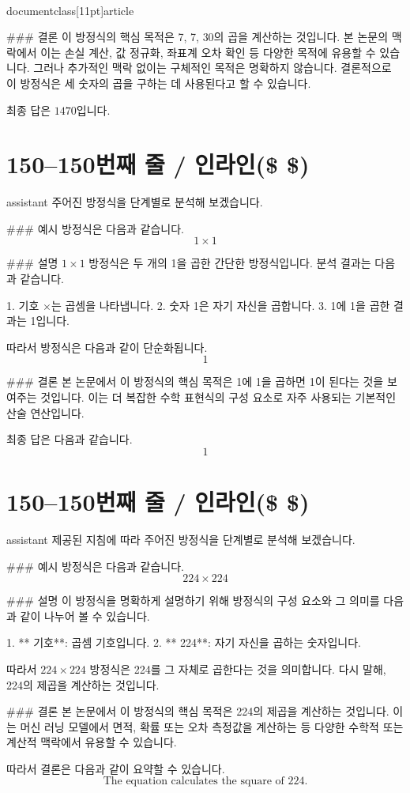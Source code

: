 \\documentclass[11pt]{article}
\begin{document}
### 결론
이 방정식의 핵심 목적은 7, 7, 30의 곱을 계산하는 것입니다. 본 논문의 맥락에서 이는 손실 계산, 값 정규화, 좌표계 오차 확인 등 다양한 목적에 유용할 수 있습니다. 그러나 추가적인 맥락 없이는 구체적인 목적은 명확하지 않습니다. 결론적으로 이 방정식은 세 숫자의 곱을 구하는 데 사용된다고 할 수 있습니다.

최종 답은 \(\boxed{1470}\)입니다.

\section*{150–150번째 줄 / 인라인(\$ \$) }
assistant
주어진 방정식을 단계별로 분석해 보겠습니다.

### 예시
방정식은 다음과 같습니다.
\[ 1 \times 1 \]

### 설명
\( 1 \times 1 \) 방정식은 두 개의 1을 곱한 간단한 방정식입니다. 분석 결과는 다음과 같습니다.

1. 기호 \(\times\)는 곱셈을 나타냅니다.
2. 숫자 1은 자기 자신을 곱합니다.
3. 1에 1을 곱한 결과는 1입니다.

따라서 방정식은 다음과 같이 단순화됩니다.
\[ 1 \]

### 결론
본 논문에서 이 방정식의 핵심 목적은 1에 1을 곱하면 1이 된다는 것을 보여주는 것입니다. 이는 더 복잡한 수학 표현식의 구성 요소로 자주 사용되는 기본적인 산술 연산입니다.

최종 답은 다음과 같습니다.
\[
\boxed{1}
\]

\section*{150–150번째 줄 / 인라인(\$ \$) }
assistant
제공된 지침에 따라 주어진 방정식을 단계별로 분석해 보겠습니다.

### 예시
방정식은 다음과 같습니다.
\[ 224 \times 224 \]

### 설명
이 방정식을 명확하게 설명하기 위해 방정식의 구성 요소와 그 의미를 다음과 같이 나누어 볼 수 있습니다.

1. ** 기호**: 곱셈 기호입니다.
2. ** 224**: 자기 자신을 곱하는 숫자입니다.

따라서 \( 224 \times 224 \) 방정식은 224를 그 자체로 곱한다는 것을 의미합니다. 다시 말해, 224의 제곱을 계산하는 것입니다.

### 결론
본 논문에서 이 방정식의 핵심 목적은 224의 제곱을 계산하는 것입니다. 이는 머신 러닝 모델에서 면적, 확률 또는 오차 측정값을 계산하는 등 다양한 수학적 또는 계산적 맥락에서 유용할 수 있습니다.

따라서 결론은 다음과 같이 요약할 수 있습니다.
\[ \text{The equation calculates the square of 224.} \]
\end{document}
